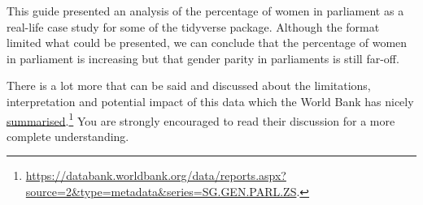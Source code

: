 \documentclass[a4paper,9pt,twocolumn,twoside,printwatermark=false]{pinp}
\begin{document}
This guide presented an analysis of the percentage of women in
parliament as a real-life case study for some of the tidyverse package.
Although the format limited what could be presented, we can conclude
that the percentage of women in parliament is increasing but that gender
parity in parliaments is still far-off.

There is a lot more that can be said and discussed about the
limitations, interpretation and potential impact of this data which the
World Bank has nicely
\href{https://databank.worldbank.org/data/reports.aspx?source=2\&type=metadata\&series=SG.GEN.PARL.ZS\#}{summarised}.\footnote{\url{https://databank.worldbank.org/data/reports.aspx?source=2\&type=metadata\&series=SG.GEN.PARL.ZS}.}
You are strongly encouraged to read their discussion for a more complete
understanding.





\end{document}
